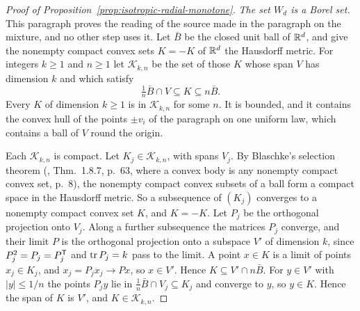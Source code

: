 \begin{proof}[Proof of Proposition~\ref{prop:isotropic-radial-monotone}]
\emph{The set $W_d$ is a Borel set.} This paragraph proves the reading of the source made in the
paragraph on the mixture, and no other step uses it. Let $\bar B$ be the closed unit ball of
$\mathbb{R}^d$, and give the nonempty compact convex sets $K = -K$ of $\mathbb{R}^d$ the Hausdorff metric. For
integers $k \ge 1$ and $n \ge 1$ let $\mathcal{K}_{k,n}$ be the set of those $K$ whose span $V$
has dimension $k$ and which satisfy
\[
  \tfrac1n\bar B \cap V \subseteq K \subseteq n\bar B .
\]
Every $K$ of dimension $k \ge 1$ is in $\mathcal{K}_{k,n}$ for some $n$. It is bounded, and it
contains the convex hull of the points $\pm v_i$ of the paragraph on one uniform law, which
contains a ball of $V$ round the origin.

Each $\mathcal{K}_{k,n}$ is compact. Let $K_j \in \mathcal{K}_{k,n}$, with spans $V_j$. By
Blaschke's selection theorem (, Thm.~1.8.7, p.~63, where a convex
body is any nonempty compact convex set, p.~8), the nonempty compact convex subsets of a ball
form a compact space in the Hausdorff metric. So a subsequence of $(K_j)$ converges to a nonempty compact convex set
$K$, and $K = -K$. Let $P_j$ be the orthogonal projection onto $V_j$. Along a further subsequence
the matrices $P_j$ converge, and their limit $P$ is the orthogonal projection onto a subspace $V'$
of dimension $k$, since $P_j^2 = P_j = P_j^{\mathsf{T}}$ and $\operatorname{tr} P_j = k$ pass to the limit. A point
$x \in K$ is a limit of points $x_j \in K_j$, and $x_j = P_jx_j \to Px$, so $x \in V'$. Hence
$K \subseteq V' \cap n\bar B$. For $y \in V'$ with $|y| \le 1/n$ the points $P_jy$ lie in
$\tfrac1n\bar B \cap V_j \subseteq K_j$ and converge to $y$, so $y \in K$. Hence the span of $K$
is $V'$, and $K \in \mathcal{K}_{k,n}$.


\end{proof}

